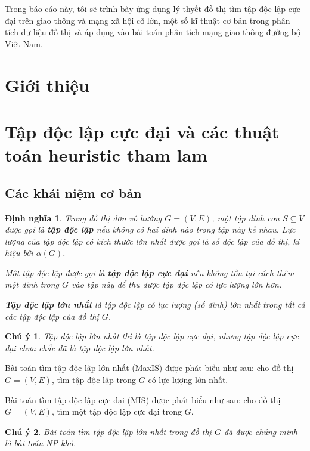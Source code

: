 \documentclass[14pt, oneside, a4paper, openany]{scrartcl}
\newtheorem*{remark}{Chú ý}
\newtheorem{definition}{Định nghĩa}[section]
\begin{document}
Trong báo cáo này, tôi sẽ trình bày ứng dụng lý thyết đồ thị tìm tập độc lập cực đại trên giao thông và mạng xã hội cỡ lớn, một số kĩ thuật cơ bản trong phân tích dữ liệu đồ thị và áp dụng vào bài toán phân tích mạng giao thông đường bộ Việt Nam.

\newpage
\section{Giới thiệu}

\newpage
\section{Tập độc lập cực đại và các thuật toán heuristic tham lam}
\subsection{Các khái niệm cơ bản}
\begin{definition}
\cite{graphtextbook} Trong đồ thị đơn vô hướng $G = (V,E)$, một tập đỉnh con $S \subseteq V$ được gọi là \textbf{tập độc lập}  nếu không có hai đỉnh nào trong tập này kề nhau. Lực lượng của tập độc lập có kích thước lớn nhất được gọi là số độc lập của đồ thị, kí hiệu bởi $\alpha(G)$.	

Một tập độc lập được gọi là \textbf{tập độc lập cực đại}  nếu không tồn tại cách thêm một đỉnh trong $G$ vào tập này để thu được tập độc lập có lực lượng lớn hơn.

\textbf{Tập độc lập lớn nhất}  là tập độc lập có lực lượng (số đỉnh) lớn nhất trong tất cả các tập độc lập của đồ thị $G$.

\end{definition}
\begin{remark}
Tập độc lập lớn nhất thì là tập độc lập cực đại, nhưng tập độc lập cực đại chưa chắc đã là tập độc lập lớn nhất.	
\end{remark}

Bài toán tìm tập độc lập lớn nhất  (MaxIS) được phát biểu như sau: cho đồ thị $G = (V,E)$, tìm tập độc lập trong $G$ có lực lượng lớn nhất.

Bài toán tìm tập độc lập cực đại  (MIS) được phát biểu như sau: cho đồ thị $G = (V,E)$, tìm một tập độc lập cực đại trong $G$.


\begin{remark}
\cite{yannakakis01} Bài toán tìm tập độc lập lớn nhất trong đồ thị $G$ đã được chứng minh là bài toán NP-khó.
\end{remark}
\end{document}
